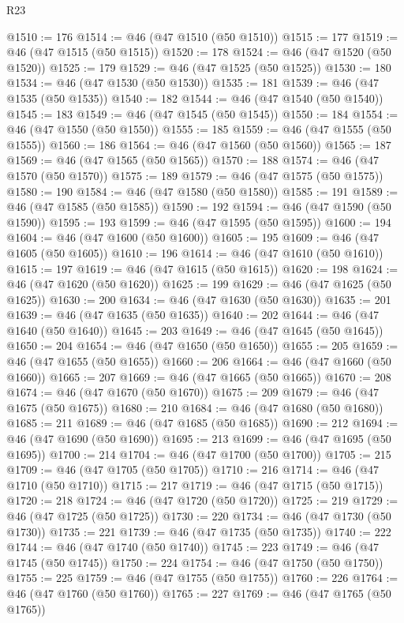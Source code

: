\begin{lexlean}{R23}
\begin{coremodule}
@1510 := 176
@1514 := @46 (@47 @1510 (@50 @1510))
@1515 := 177
@1519 := @46 (@47 @1515 (@50 @1515))
@1520 := 178
@1524 := @46 (@47 @1520 (@50 @1520))
@1525 := 179
@1529 := @46 (@47 @1525 (@50 @1525))
@1530 := 180
@1534 := @46 (@47 @1530 (@50 @1530))
@1535 := 181
@1539 := @46 (@47 @1535 (@50 @1535))
@1540 := 182
@1544 := @46 (@47 @1540 (@50 @1540))
@1545 := 183
@1549 := @46 (@47 @1545 (@50 @1545))
@1550 := 184
@1554 := @46 (@47 @1550 (@50 @1550))
@1555 := 185
@1559 := @46 (@47 @1555 (@50 @1555))
@1560 := 186
@1564 := @46 (@47 @1560 (@50 @1560))
@1565 := 187
@1569 := @46 (@47 @1565 (@50 @1565))
@1570 := 188
@1574 := @46 (@47 @1570 (@50 @1570))
@1575 := 189
@1579 := @46 (@47 @1575 (@50 @1575))
@1580 := 190
@1584 := @46 (@47 @1580 (@50 @1580))
@1585 := 191
@1589 := @46 (@47 @1585 (@50 @1585))
@1590 := 192
@1594 := @46 (@47 @1590 (@50 @1590))
@1595 := 193
@1599 := @46 (@47 @1595 (@50 @1595))
@1600 := 194
@1604 := @46 (@47 @1600 (@50 @1600))
@1605 := 195
@1609 := @46 (@47 @1605 (@50 @1605))
@1610 := 196
@1614 := @46 (@47 @1610 (@50 @1610))
@1615 := 197
@1619 := @46 (@47 @1615 (@50 @1615))
@1620 := 198
@1624 := @46 (@47 @1620 (@50 @1620))
@1625 := 199
@1629 := @46 (@47 @1625 (@50 @1625))
@1630 := 200
@1634 := @46 (@47 @1630 (@50 @1630))
@1635 := 201
@1639 := @46 (@47 @1635 (@50 @1635))
@1640 := 202
@1644 := @46 (@47 @1640 (@50 @1640))
@1645 := 203
@1649 := @46 (@47 @1645 (@50 @1645))
@1650 := 204
@1654 := @46 (@47 @1650 (@50 @1650))
@1655 := 205
@1659 := @46 (@47 @1655 (@50 @1655))
@1660 := 206
@1664 := @46 (@47 @1660 (@50 @1660))
@1665 := 207
@1669 := @46 (@47 @1665 (@50 @1665))
@1670 := 208
@1674 := @46 (@47 @1670 (@50 @1670))
@1675 := 209
@1679 := @46 (@47 @1675 (@50 @1675))
@1680 := 210
@1684 := @46 (@47 @1680 (@50 @1680))
@1685 := 211
@1689 := @46 (@47 @1685 (@50 @1685))
@1690 := 212
@1694 := @46 (@47 @1690 (@50 @1690))
@1695 := 213
@1699 := @46 (@47 @1695 (@50 @1695))
@1700 := 214
@1704 := @46 (@47 @1700 (@50 @1700))
@1705 := 215
@1709 := @46 (@47 @1705 (@50 @1705))
@1710 := 216
@1714 := @46 (@47 @1710 (@50 @1710))
@1715 := 217
@1719 := @46 (@47 @1715 (@50 @1715))
@1720 := 218
@1724 := @46 (@47 @1720 (@50 @1720))
@1725 := 219
@1729 := @46 (@47 @1725 (@50 @1725))
@1730 := 220
@1734 := @46 (@47 @1730 (@50 @1730))
@1735 := 221
@1739 := @46 (@47 @1735 (@50 @1735))
@1740 := 222
@1744 := @46 (@47 @1740 (@50 @1740))
@1745 := 223
@1749 := @46 (@47 @1745 (@50 @1745))
@1750 := 224
@1754 := @46 (@47 @1750 (@50 @1750))
@1755 := 225
@1759 := @46 (@47 @1755 (@50 @1755))
@1760 := 226
@1764 := @46 (@47 @1760 (@50 @1760))
@1765 := 227
@1769 := @46 (@47 @1765 (@50 @1765))

\end{coremodule}
\end{lexlean}
